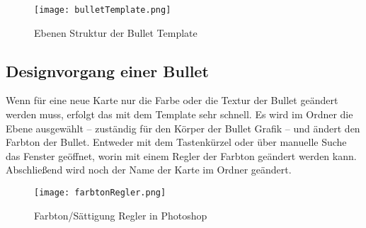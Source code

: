 \begin{figure}[H]
    \centering
    \texttt{[image: bulletTemplate.png]}
    \caption{Ebenen Struktur der Bullet Template}
\end{figure}

\subsection{Designvorgang einer Bullet}

Wenn für eine neue Karte nur die Farbe oder die Textur der Bullet geändert werden muss, erfolgt das mit dem Template sehr schnell. Es wird im Ordner  die Ebene  ausgewählt – zuständig für den Körper der Bullet Grafik – und ändert den Farbton der Bullet. Entweder mit dem Tastenkürzel
 oder über manuelle Suche das Fenster
 geöffnet, worin mit einem Regler der Farbton geändert werden kann. Abschließend wird noch der Name der Karte
im  Ordner geändert.

\begin{figure}[H]
    \centering
    \texttt{[image: farbtonRegler.png]}
    \caption{Farbton/Sättigung Regler in Photoshop}
\end{figure}

